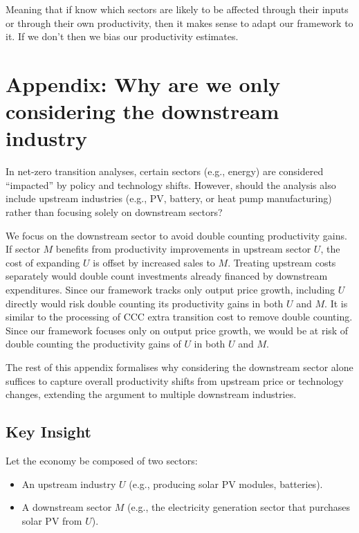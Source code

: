 \documentclass[11pt]{article}
\begin{document}
Meaning that if know which sectors are likely to be affected through their inputs or through their own productivity, then it makes sense to adapt our framework to it. If we don't then we bias our productivity estimates. 


\section{Appendix: Why are we only considering the downstream industry}
\label{appendix_downstream_industry}

In net-zero transition analyses, certain sectors (e.g., energy) are considered ``impacted'' by policy and technology shifts. However, should the analysis also include upstream industries (e.g., PV, battery, or heat pump manufacturing) rather than focusing solely on downstream sectors?

We focus on the downstream sector to avoid double counting productivity gains. If sector $M$ benefits from productivity improvements in upstream sector $U$, the cost of expanding $U$ is offset by increased sales to $M$. Treating upstream costs separately would double count investments already financed by downstream expenditures. Since our framework tracks only output price growth, including $U$ directly would risk double counting its productivity gains in both $U$ and $M$. It is similar to the processing of CCC extra transition cost to remove double counting. Since our framework focuses only on output price growth, we would be at risk of double counting the productivity gains of $U$ in both $U$ and $M$.

The rest of this appendix formalises why considering the downstream sector alone suffices to capture overall productivity shifts from upstream price or technology changes, extending the argument to multiple downstream industries.

\subsection{Key Insight}
\label{appendix_onepager}


Let the economy be composed of two sectors:
\begin{itemize}
    \item An upstream industry $U$ (e.g., producing solar PV modules, batteries).
    \item A downstream sector $M$ (e.g., the electricity generation sector that purchases solar PV from $U$).
\end{itemize}
\end{document}
